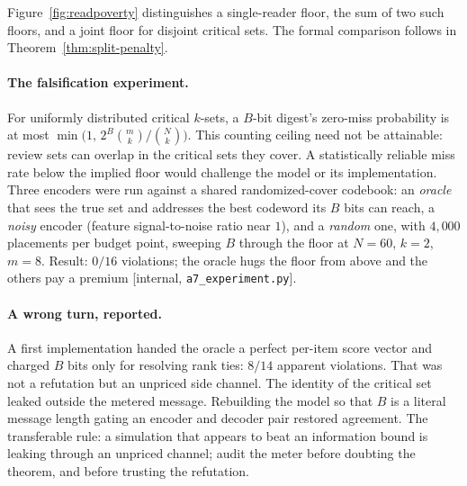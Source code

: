 \documentclass[11pt,a4paper]{article}
\theoremstyle{definition}
\theoremstyle{plain}
\begin{document}
Figure~\ref{fig:readpoverty} distinguishes a single-reader floor, the sum
of two such floors, and a joint floor for disjoint critical sets. The formal
comparison follows in Theorem~\ref{thm:split-penalty}.



\paragraph{The falsification experiment.} For uniformly distributed critical
$k$-sets, a $B$-bit digest's zero-miss probability is at most
$\min\bigl(1,\,2^B\binom{m}{k}/\binom{N}{k}\bigr)$. This counting ceiling need
not be attainable: review sets can overlap in the critical sets they cover.
A statistically reliable miss rate below the implied floor would challenge
the model or its implementation. Three encoders were run against a
shared randomized-cover codebook: an \emph{oracle} that sees the true set and
addresses the best codeword its $B$ bits can reach, a \emph{noisy} encoder (feature
signal-to-noise ratio near $1$), and a \emph{random} one, with $4{,}000$ placements
per budget point, sweeping $B$ through the floor at $N{=}60$, $k{=}2$, $m{=}8$.
Result: $0/16$ violations; the oracle hugs the floor from above and the others pay
a premium [internal, \texttt{a7\_experiment.py}].

\paragraph{A wrong turn, reported.} A first implementation handed the oracle a
perfect per-item score vector and charged $B$ bits only for resolving rank ties:
$8/14$ apparent violations. That was not a refutation but an unpriced side channel.
The identity of the critical set leaked outside the metered message. Rebuilding
the model so that $B$ is a literal message length gating an encoder and decoder pair
restored agreement. The transferable rule: a simulation that appears to beat an
information bound is leaking through an unpriced channel; audit the meter before
doubting the theorem, and before trusting the refutation.
\end{document}
